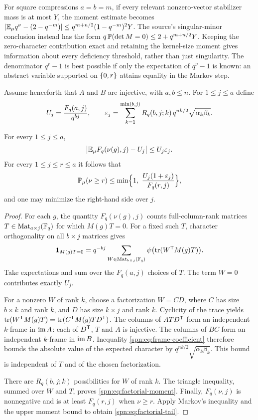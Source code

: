 For square compressions $a=b=m$, if every relevant nonzero-vector stabilizer
mass is at most $Y$, the moment estimate becomes
$\abs{\spnE_\mu q^\nu-(2-q^{-m})}\le q^{m+n/2}(1-q^{-m})^2Y$. The source's
singular-minor conclusion instead has the form
$q\,\spnP(\det M=0)\le2+q^{m+n/2}Y$. Keeping the zero-character contribution
exact and retaining the kernel-size moment gives information about every
deficiency threshold, rather than just singularity. The denominator $q^r-1$
is best possible if only the expectation of $q^\nu-1$ is known: an abstract
variable supported on $\set{0,r}$ attains equality in the Markov step.

Assume henceforth that $A$ and $B$ are injective, with $a,b\le n$. For
$1\le j\le a$ define
\begin{equation}\label{spn:eq:moment-main}
 U_j=\frac{F_q(a,j)}{q^{bj}},\qquad
 \eps_j=\sum_{k=1}^{\min(b,j)}R_q(b,j;k)\,q^{nk/2}\sqrt{\alpha_k\beta_k} .
\end{equation}

\begin{theorem}\label{spn:thm:factorial-kernel}
For every $1\le j\le a$,
\begin{equation}\label{spn:eq:factorial-moment}
 \abs[\big]{\spnE_\mu F_q(\nu(g),j)-U_j}\le U_j\eps_j .
\end{equation}
For every $1\le j\le r\le a$ it follows that
\begin{equation}\label{spn:eq:factorial-tail}
 \spnP_\mu(\nu\ge r)\le\min\Bigl\{1,\ \frac{U_j(1+\eps_j)}{F_q(r,j)}\Bigr\},
\end{equation}
and one may minimize the right-hand side over $j$.
\end{theorem}

\begin{proof}
For each $g$, the quantity $F_q(\nu(g),j)$ counts full-column-rank matrices
$T\in\spnMat_{a\times j}(\F_q)$ for which $M(g)T=0$. For a fixed such $T$,
character orthogonality on all $b\times j$ matrices gives
\[
 \mathbf 1_{M(g)T=0}=q^{-bj}\sum_{W\in\spnMat_{b\times j}(\F_q)}
 \psi\bigl(\tr(W^{\spnT}M(g)T)\bigr).
\]
Take expectations and sum over the $F_q(a,j)$ choices of $T$. The term $W=0$
contributes exactly $U_j$.

For a nonzero $W$ of rank $k$, choose a factorization $W=CD$, where $C$ has
size $b\times k$ and rank $k$, and $D$ has size $k\times j$ and rank $k$.
Cyclicity of the trace yields
$\tr(W^{\spnT}M(g)T)=\tr(C^{\spnT}M(g)TD^{\spnT})$. The columns of
$ATD^{\spnT}$ form an independent $k$-frame in $\spnim A$: each of
$D^{\spnT}$, $T$ and $A$ is injective. The columns of $BC$ form an
independent $k$-frame in $\spnim B$. Inequality
\eqref{spn:eq:frame-coefficient} therefore bounds the absolute value of the
expected character by $q^{nk/2}\sqrt{\alpha_k\beta_k}$. This bound is
independent of $T$ and of the chosen factorization.

There are $R_q(b,j;k)$ possibilities for $W$ of rank $k$. The triangle
inequality, summed over $W$ and $T$, proves \eqref{spn:eq:factorial-moment}.
Finally, $F_q(\nu,j)$ is nonnegative and is at least $F_q(r,j)$ when
$\nu\ge r$. Apply Markov's inequality and the upper moment bound to obtain
\eqref{spn:eq:factorial-tail}.
\end{proof}


